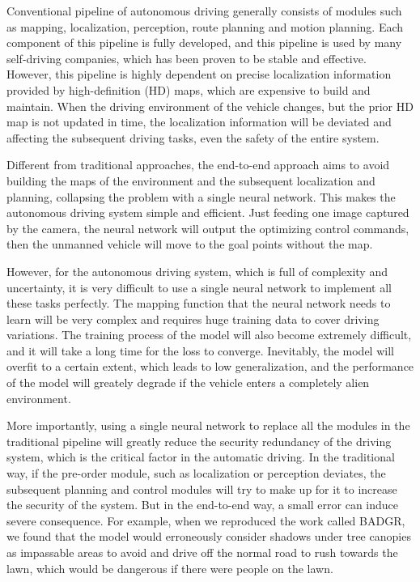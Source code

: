 \documentclass[letterpaper,10 pt,conference]{ieeeconf}  %
\begin{document}
Conventional pipeline of autonomous driving generally consists of modules such as mapping, localization, perception, route planning and motion planning. Each component of this pipeline is fully developed, and this pipeline is used by many self-driving companies, which has been proven to be stable and effective. However, this pipeline is highly dependent on precise localization information provided by high-definition (HD) maps, which are expensive to build and maintain. When the driving environment of the vehicle changes, but the prior HD map is not updated in time, the localization information will be deviated and affecting the subsequent driving tasks, even the safety of the entire system.

Different from traditional approaches, the end-to-end approach aims to avoid building the maps of the environment and the subsequent localization and planning, collapsing the problem with a single neural network\cite{4}. This makes the autonomous driving system simple and efficient. Just feeding one image captured by the camera, the neural network will output the optimizing control commands, then the unmanned vehicle will move to the goal points without the map.

However, for the autonomous driving system, which is full of complexity and uncertainty, it is very difficult to use a single neural network to implement all these tasks perfectly. The mapping function that the neural network needs to learn will be very complex and requires huge training data to cover driving variations. The training process of the model will also become extremely difficult, and it will take a long time for the loss to converge. Inevitably, the model will overfit to a certain extent, which leads to low generalization, and the performance of the model will greately degrade if the vehicle enters a completely alien environment.

More importantly, using a single neural network to replace all the modules in the traditional pipeline will greatly reduce the security redundancy of the driving system, which is the critical factor in the automatic driving. In the traditional way, if the pre-order module, such as localization or perception deviates, the subsequent planning and control modules will try to make up for it to increase the security of the system. But in the end-to-end way, a small error can induce severe consequence. For example, when we reproduced the work called BADGR\cite{6}, we found that the model would erroneously consider shadows under tree canopies as impassable areas to avoid and drive off the normal road to rush towards the lawn, which would be dangerous if there were people on the lawn.
\end{document}
